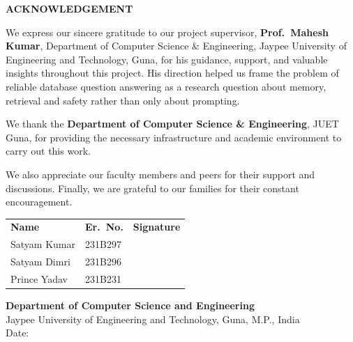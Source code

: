 \newpage
\thispagestyle{plain}
\begingroup
\setlength{\parskip}{6pt}
\fontsize{14}{21}\selectfont

\begin{center}
    {\fontsize{16}{24}\selectfont\bfseries ACKNOWLEDGEMENT\\[12pt]}
\end{center}

We express our sincere gratitude to our project supervisor,
\textbf{Prof.\ Mahesh Kumar}, Department of Computer Science \& Engineering,
Jaypee University of Engineering and Technology, Guna, for his guidance,
support, and valuable insights throughout this project. His direction helped us
frame the problem of reliable database question answering as a research question
about memory, retrieval and safety rather than only about prompting.

We thank the \textbf{Department of Computer Science \& Engineering}, JUET Guna,
for providing the necessary infrastructure and academic environment to carry
out this work.

We also appreciate our faculty members and peers for their support and
discussions. Finally, we are grateful to our families for their constant
encouragement.

\vfill

\noindent
\begin{tabular}{p{5.0cm} p{2.8cm} p{5.0cm}}
    \bfseries Name      & \bfseries Er.\ No. & \bfseries Signature            \\[20pt]
    Satyam Kumar        & 231B297            & \underline{\hspace{4cm}}       \\[16pt]
    Satyam Dimri        & 231B296            & \underline{\hspace{4cm}}       \\[16pt]
    Prince Yadav        & 231B231            & \underline{\hspace{4cm}}       \\
\end{tabular}

\vspace{1cm}
\noindent\textbf{Department of Computer Science and Engineering}\\
Jaypee University of Engineering and Technology, Guna, M.P., India\\[8pt]
Date:\enspace\underline{\hspace{3.5cm}}

\endgroup
\clearpage

